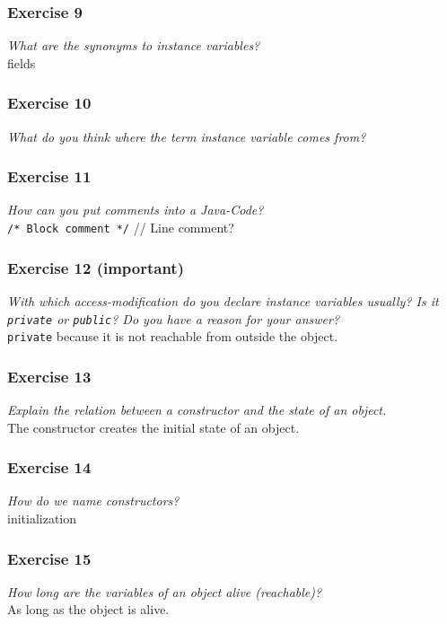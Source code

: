 \subsubsection*{Exercise 9}
\textit{What are the synonyms to instance variables?}\\
fields

\subsubsection*{Exercise 10}
\textit{What do you think where the term instance variable comes from?}\\


\subsubsection*{Exercise 11}
\textit{How can you put comments into a Java-Code?}\\
\lstinline{/* Block comment */}
// Line comment?

\subsubsection*{Exercise 12 (important)}
\textit{With which access-modification do you declare instance variables
	usually? Is it \lstinline{private} or \lstinline{public}? Do you
	have a reason for your answer?}\\
\lstinline{private} because it is not reachable from outside the object. 

\subsubsection*{Exercise 13}
\textit{Explain the relation between a constructor and the state of an 
	object.}\\
The constructor creates the initial state of an object. 

\subsubsection*{Exercise 14}
\textit{How do we name constructors?}\\
initialization

\subsubsection*{Exercise 15}
\textit{How long are the variables of an object alive (reachable)?}\\
As long as the object is alive. 

